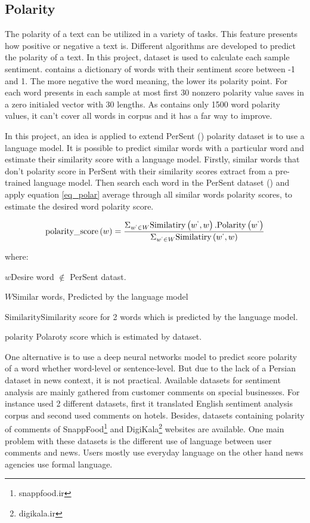 \subsection{Polarity}  
The polarity of a text can be utilized in a variety of tasks. This feature presents how positive or negative a text is. Different algorithms are developed to predict the polarity of a text. In this project, \cite{persent} dataset is used to calculate each sample sentiment. \cite{persent} contains a dictionary of words with their sentiment score between -1 and 1. The more negative the word meaning, the lower its polarity point. For each word presents in each sample at most first 30 nonzero polarity value saves in a zero initialed vector with 30 lengths. As \cite{persent} contains only 1500 word polarity values, it can't cover all words in corpus and it has a far way to improve. 

In this project, an idea is applied to extend PerSent (\cite{persent}) polarity dataset is to use a language model. It is possible to predict similar words with a particular word and estimate their similarity score with a language model. Firstly, similar words that don't polarity score in PerSent with their similarity scores extract from a pre-trained language model. Then search each word in the PerSent dataset (\cite{persent}) and apply equation \ref{eq_polar} average through all similar words polarity scores, to estimate the desired word polarity score.

\begin{equation}
	\label{eq_polar}
	\text{polarity\_score}\left(w\right) = \frac{\Sigma_{w^{`} \in W} \text{Similatiry}\left(w^{`}, w\right) . \text{Polarity}\left(w^{`}\right)}{\Sigma_{w^{`} \in W} \text{Similatiry}\left(w^{`}, w\right)}
\end{equation}

where: 
\begin{eqexpl}[25mm]
	\item{$w$}Desire word $\notin$ PerSent datast.
	\item{$W$}Similar words, Predicted by the language model
	\item{$\text{Similarity}$}Similarity score for 2 words which is predicted by the language model.
	\item{$\text{polarity}$} Polaroty score which is estimated by \cite{persent} dataset.
\end{eqexpl}

\bigbreak
One alternative is to use a deep neural networks model to predict score polarity of a word whether word-level or sentence-level. But due to the lack of a Persian dataset in news context, it is not practical. Available datasets for sentiment analysis are mainly gathered from customer comments on special businesses. For instance \cite{polar_hotel} used 2 different datasets, first it translated English sentiment analysis corpus and second used comments on hotels. Besides, datasets containing polarity of comments of SnappFood\footnote{snappfood.ir} and DigiKala\footnote{digikala.ir} websites are available. One main problem with these datasets is the different use of language between user comments and news. Users mostly use everyday language on the other hand news agencies use formal language.



